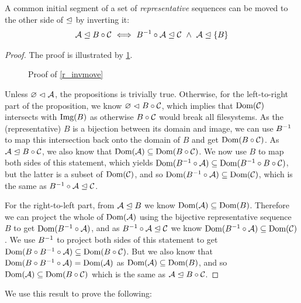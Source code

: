 \begin{mylem}\label{r_invmove}
A common initial segment of a set of \emph{representative} sequences can be moved 
to the other side of $\trianglelefteq$ by inverting it:
\begin{gather*}
{\mathcal{A}}\trianglelefteq{B\circ\mathcal{C}}
\ \Longleftrightarrow \ {B^{-1}\circ\mathcal{A}}\trianglelefteq{\mathcal{C}} 
\ \wedge \  {\mathcal{A}}\trianglelefteq{\{B\}}
\end{gather*}
\end{mylem}
\begin{proof}

The proof is illustrated by \cref{fig_invmove}.

\begin{figure}[htb]

\caption{Proof of \cref{r_invmove}}\label{fig_invmove}
\end{figure}

Unless ${\varnothing}\vartriangleleft{\mathcal{A}}$, the propositions is trivially true. Otherwise,
for the left-to-right part of the proposition,
we know ${\varnothing}\vartriangleleft{B\circ\mathcal{C}}$, which implies that $\textrm{Dom}({\mathcal{C}})$ intersects with $\textrm{Img}({B})$ 
as otherwise $B\circ\mathcal{C}$ would break all filesystems.
As the (representative) $B$ is a bijection between its domain and image,
we can use $B^{-1}$ to map this intersection back
onto the domain of $B$ and get $\textrm{Dom}({B\circ\mathcal{C}})$.
As ${\mathcal{A}}\trianglelefteq{B\circ\mathcal{C}}$, 
we also know that $\textrm{Dom}({\mathcal{A}}) \subseteq \textrm{Dom}({B\circ\mathcal{C}})$.
We now use $B$ to map both sides of this statement, which yields
$\textrm{Dom}({B^{-1}\circ\mathcal{A}}) \subseteq \textrm{Dom}({B^{-1}\circ B\circ\mathcal{C}})$,
but the latter is a subset of $\textrm{Dom}({\mathcal{C}})$,
and so $\textrm{Dom}({B^{-1}\circ\mathcal{A}}) \subseteq \textrm{Dom}({\mathcal{C}})$,
which is the same as ${B^{-1}\circ\mathcal{A}}\trianglelefteq{\mathcal{C}}$.

For the right-to-left part,
from ${\mathcal{A}}\trianglelefteq{B}$ we know $\textrm{Dom}({\mathcal{A}}) \subseteq \textrm{Dom}({B})$.
Therefore we can project the whole of $\textrm{Dom}({\mathcal{A}})$ using the bijective representative sequence $B$
to get $\textrm{Dom}({B^{-1}\circ\mathcal{A}})$, and as ${B^{-1}\circ\mathcal{A}}\trianglelefteq{\mathcal{C}}$
we know
$\textrm{Dom}({B^{-1}\circ\mathcal{A}}) \subseteq \textrm{Dom}({\mathcal{C}})$.
We use $B^{-1}$ to project both sides of this statement to get
$\textrm{Dom}({B\circ B^{-1}\circ\mathcal{A}}) \subseteq \textrm{Dom}({B\circ\mathcal{C}})$.
But we also know that $\textrm{Dom}({B\circ B^{-1}\circ\mathcal{A}}) = \textrm{Dom}({\mathcal{A}})$
as $\textrm{Dom}({\mathcal{A}}) \subseteq \textrm{Dom}({B})$,
and so $\textrm{Dom}({\mathcal{A}}) \subseteq \textrm{Dom}({B\circ\mathcal{C}})$ which is the same as
${\mathcal{A}}\trianglelefteq{B\circ\mathcal{C}}$.
\end{proof}

We use this result to prove the following:

